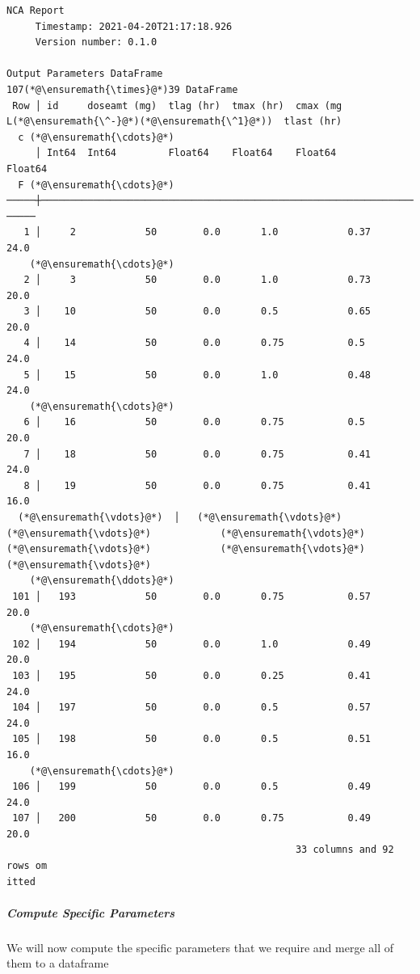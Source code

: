 \documentclass[12pt,a4paper]{article}
\begin{document}
\begin{lstlisting}
NCA Report
     Timestamp: 2021-04-20T21:17:18.926
     Version number: 0.1.0

Output Parameters DataFrame
107(*@\ensuremath{\times}@*)39 DataFrame
 Row │ id     doseamt (mg)  tlag (hr)  tmax (hr)  cmax (mg L(*@\ensuremath{\^-}@*)(*@\ensuremath{\^1}@*))  tlast (hr)
  c (*@\ensuremath{\cdots}@*)
     │ Int64  Int64         Float64    Float64    Float64        Float64   
  F (*@\ensuremath{\cdots}@*)
─────┼─────────────────────────────────────────────────────────────────────
─────
   1 │     2            50        0.0       1.0            0.37        24.0
    (*@\ensuremath{\cdots}@*)
   2 │     3            50        0.0       1.0            0.73        20.0
   3 │    10            50        0.0       0.5            0.65        20.0
   4 │    14            50        0.0       0.75           0.5         24.0
   5 │    15            50        0.0       1.0            0.48        24.0
    (*@\ensuremath{\cdots}@*)
   6 │    16            50        0.0       0.75           0.5         20.0
   7 │    18            50        0.0       0.75           0.41        24.0
   8 │    19            50        0.0       0.75           0.41        16.0
  (*@\ensuremath{\vdots}@*)  │   (*@\ensuremath{\vdots}@*)         (*@\ensuremath{\vdots}@*)            (*@\ensuremath{\vdots}@*)          (*@\ensuremath{\vdots}@*)            (*@\ensuremath{\vdots}@*)            (*@\ensuremath{\vdots}@*)     
    (*@\ensuremath{\ddots}@*)
 101 │   193            50        0.0       0.75           0.57        20.0
    (*@\ensuremath{\cdots}@*)
 102 │   194            50        0.0       1.0            0.49        20.0
 103 │   195            50        0.0       0.25           0.41        24.0
 104 │   197            50        0.0       0.5            0.57        24.0
 105 │   198            50        0.0       0.5            0.51        16.0
    (*@\ensuremath{\cdots}@*)
 106 │   199            50        0.0       0.5            0.49        24.0
 107 │   200            50        0.0       0.75           0.49        20.0
                                                  33 columns and 92 rows om
itted
\end{lstlisting}


\subparagraph{Compute Specific Parameters}
We will now compute the specific parameters that we require and merge all of them to a dataframe
\end{document}
